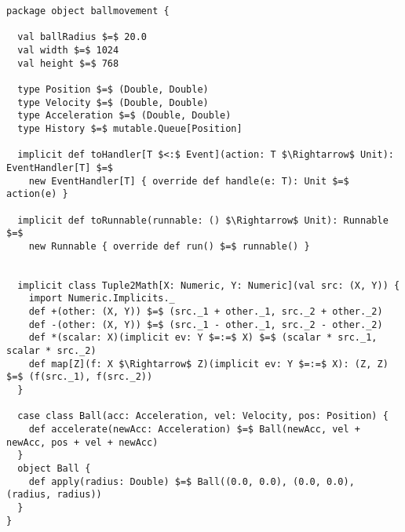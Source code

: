 \begin{lstlisting}[style=ScalaStyle, caption={Ball movement control}, label={lst:ball-full-utils}]
package object ballmovement {

  val ballRadius $=$ 20.0
  val width $=$ 1024
  val height $=$ 768

  type Position $=$ (Double, Double)
  type Velocity $=$ (Double, Double)
  type Acceleration $=$ (Double, Double)
  type History $=$ mutable.Queue[Position]
  
  implicit def toHandler[T $<:$ Event](action: T $\Rightarrow$ Unit): EventHandler[T] $=$
    new EventHandler[T] { override def handle(e: T): Unit $=$ action(e) }

  implicit def toRunnable(runnable: () $\Rightarrow$ Unit): Runnable $=$
    new Runnable { override def run() $=$ runnable() }


  implicit class Tuple2Math[X: Numeric, Y: Numeric](val src: (X, Y)) {
    import Numeric.Implicits._
    def +(other: (X, Y)) $=$ (src._1 + other._1, src._2 + other._2)
    def -(other: (X, Y)) $=$ (src._1 - other._1, src._2 - other._2)
    def *(scalar: X)(implicit ev: Y $=:=$ X) $=$ (scalar * src._1, scalar * src._2)
    def map[Z](f: X $\Rightarrow$ Z)(implicit ev: Y $=:=$ X): (Z, Z) $=$ (f(src._1), f(src._2))
  }

  case class Ball(acc: Acceleration, vel: Velocity, pos: Position) {
    def accelerate(newAcc: Acceleration) $=$ Ball(newAcc, vel + newAcc, pos + vel + newAcc)
  }
  object Ball {
    def apply(radius: Double) $=$ Ball((0.0, 0.0), (0.0, 0.0), (radius, radius))
  }
}
\end{lstlisting}
